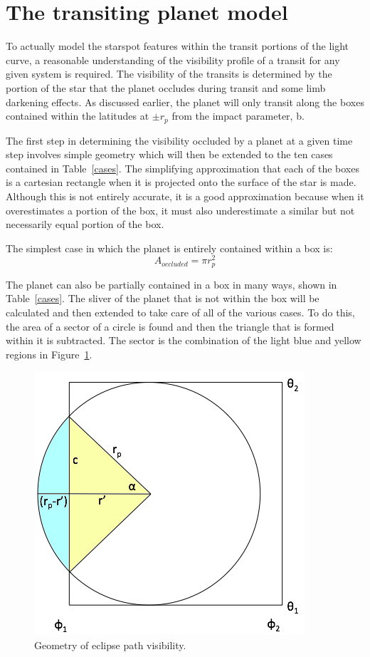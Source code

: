 \section{The transiting planet model \label{transit_model}}
To actually model the starspot features within the transit portions of the light curve, a reasonable understanding of the visibility profile of a transit for any given system is required. The visibility of the transits is determined by the portion of the star that the planet occludes during transit and some limb darkening effects. As discussed earlier, the planet will only transit along the boxes contained within the latitudes at $\pm r_p$ from the impact parameter, b. 
 
The first step in determining the visibility occluded by a planet at a given time step involves simple geometry which will then be extended to the ten cases contained in Table~\ref{cases}. The simplifying approximation that each of the boxes is a cartesian rectangle when it is projected onto the surface of the star is made. Although this is not entirely accurate, it is a good approximation because when it overestimates a portion of the box, it must also underestimate a similar but not necessarily equal portion of the box.

The simplest case in which the planet is entirely contained within a box is:
\begin{equation}
	A_{occluded} = \pi r_p^2
\end{equation}

The planet can also be partially contained in a box in many ways, shown in Table~\ref{cases}. The sliver of the planet that is not within the box will be calculated and then extended to take care of all of the various cases. To do this, the area of a sector of a circle is found and then the triangle that is formed within it is subtracted. The sector is the combination of the light blue and yellow regions in Figure~\ref{eclipse}.
\begin{figure}[h]
	\centering
	\includegraphics[width=.5\textwidth]{images/figure.png}
	\caption{Geometry of eclipse path visibility.}
	\label{eclipse}
\end{figure}

